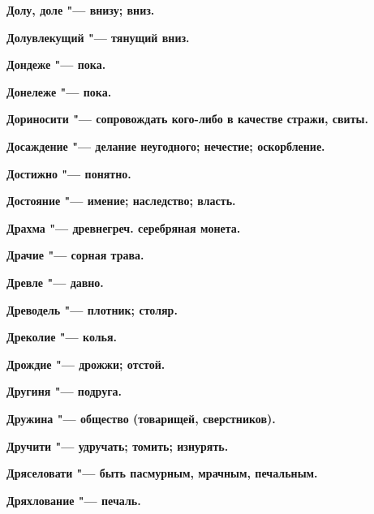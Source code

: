 \begin{mymulticols}{2}
\bfseries Долу, доле\normalfont{} "--- внизу; вниз. 




\bfseries Долувлекущий\normalfont{} "--- тянущий вниз. 




\bfseries Дондеже\normalfont{} "--- пока. 




\bfseries Донележе\normalfont{} "--- пока. 




\bfseries Дориносити\normalfont{} "--- сопровождать кого-либо в качестве стражи, свиты. 




\bfseries Досаждение\normalfont{} "--- делание неугодного; нечестие; оскорбление. 




\bfseries Достижно\normalfont{} "--- понятно. 




\bfseries Достояние\normalfont{} "--- имение; наследство; власть. 




\bfseries Драхма\normalfont{} "--- древнегреч. серебряная монета. 




\bfseries Драчие\normalfont{} "--- сорная трава. 




\bfseries Древле\normalfont{} "--- давно. 




\bfseries Древодель\normalfont{} "--- плотник; столяр. 




\bfseries Дреколие\normalfont{} "--- колья. 




\bfseries Дрождие\normalfont{} "--- дрожжи; отстой. 




\bfseries Другиня\normalfont{} "--- подруга. 




\bfseries Дружина\normalfont{} "--- общество (товарищей, сверстников). 




\bfseries Дручити\normalfont{} "--- удручать; томить; изнурять. 




\bfseries Дряселовати\normalfont{} "--- быть пасмурным, мрачным, печальным. 




\bfseries Дряхлование\normalfont{} "--- печаль. 





\end{mymulticols}
